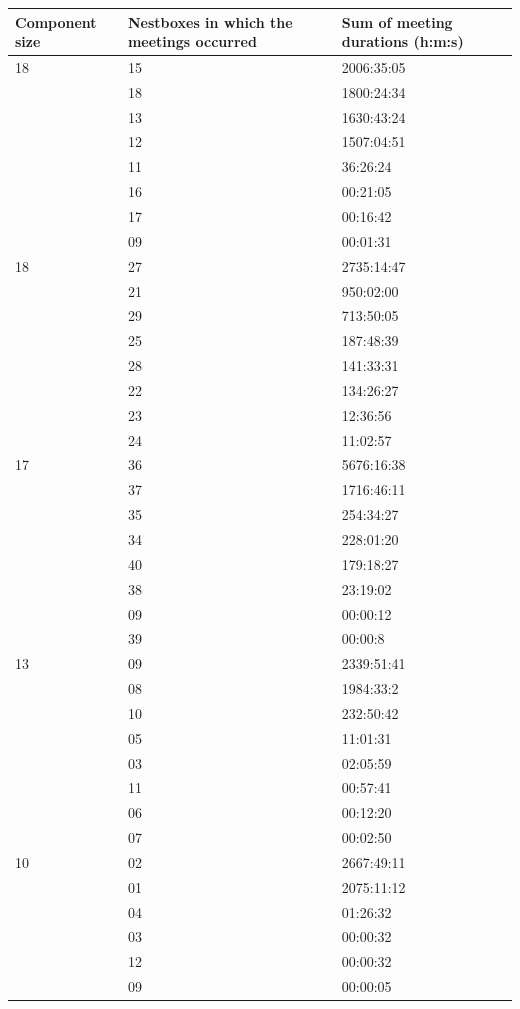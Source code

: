 \begin{table}
\begin{center}
\small
\begin{tabular}{lll}
\hline
\textbf{Component size} &	\textbf{Nestboxes in which the meetings occurred}	&	\textbf{Sum of meeting durations (h:m:s)} \\\hline
18	& 15	& 2006:35:05 \\
 	& 18	& 1800:24:34 \\
	& 13	& 1630:43:24 \\
	& 12	& 1507:04:51 \\
	& 11	& 36:26:24 \\
	& 16	& 00:21:05 \\
	& 17	& 00:16:42 \\
	& 09	& 00:01:31 \\\hline

18	& 27	& 2735:14:47 \\
	& 21	& 950:02:00 \\
	& 29	& 713:50:05 \\
	& 25	& 187:48:39 \\
	& 28	& 141:33:31 \\
	& 22	& 134:26:27 \\
	& 23 	& 12:36:56 \\
	& 24	& 11:02:57 \\\hline

17	& 36	& 5676:16:38 \\
	& 37	& 1716:46:11 \\
	& 35	& 254:34:27 \\
	& 34	& 228:01:20 \\
	& 40	& 179:18:27 \\
	& 38	& 23:19:02 \\
	& 09	& 00:00:12 \\
	& 39	& 00:00:8 \\\hline

13	& 09	& 2339:51:41 \\
	& 08 	& 1984:33:2 \\
	& 10	& 232:50:42 \\
	& 05	& 11:01:31 \\
	& 03 	& 02:05:59 \\
	& 11 	& 00:57:41 \\
	& 06	& 00:12:20 \\
	& 07	& 00:02:50 \\\hline
	
10	& 02	& 2667:49:11 \\
	& 01	& 2075:11:12 \\
	& 04	& 01:26:32 \\
	& 03	& 00:00:32 \\
	& 12	& 00:00:32 \\
	& 09	& 00:00:05 \\\hline


\end{tabular}
\end{center}
\end{table}
